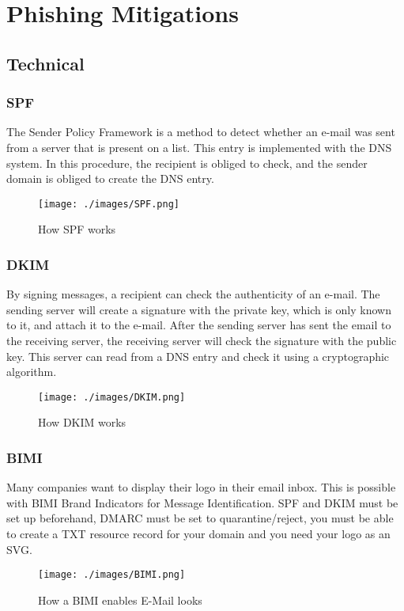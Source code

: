 \chapter{Phishing Mitigations}
\section{Technical}

\subsection{SPF}
The Sender Policy Framework is a method to detect whether an e-mail was sent from a server that is present on a list. This entry is implemented with the DNS system.
In this procedure, the recipient is obliged to check, and the sender domain is obliged to create the DNS entry.

\begin{figure}[H]
    \centering
    \texttt{[image: ./images/SPF.png]}
    \caption{How SPF works}
\end{figure}

\subsection{DKIM}
By signing messages, a recipient can check the authenticity of an e-mail.
The sending server will create a signature with the private key, which is only known to it, and attach it to the e-mail.
After the sending server has sent the email to the receiving server, the receiving server will check the signature with the public key.
This server can read from a DNS entry and check it using a cryptographic algorithm.

\begin{figure}[H]
    \centering
    \texttt{[image: ./images/DKIM.png]}
    \caption{How DKIM works}
\end{figure}

\subsection{BIMI}
Many companies want to display their logo in their email inbox.
This is possible with BIMI Brand Indicators for Message Identification.
SPF and DKIM must be set up beforehand, DMARC must be set to quarantine/reject, you must be able to create a TXT resource record for your domain and you need your logo as an SVG.

\begin{figure}[H]
    \centering
    \texttt{[image: ./images/BIMI.png]}
    \caption{How a BIMI enables E-Mail looks}
\end{figure}

